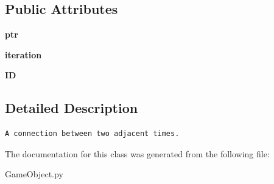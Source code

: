 \subsection*{Public Attributes}
\begin{CompactItemize}
\item 
\hypertarget{classGameObject_1_1Portal_b8d30df65bff59aa2336d8a1f8a266d7}{
\textbf{ptr}}
\label{classGameObject_1_1Portal_b8d30df65bff59aa2336d8a1f8a266d7}

\item 
\hypertarget{classGameObject_1_1Portal_f5373bbc57189b566748d050c4eafad5}{
\textbf{iteration}}
\label{classGameObject_1_1Portal_f5373bbc57189b566748d050c4eafad5}

\item 
\hypertarget{classGameObject_1_1Portal_b3b6e17b22187150345d32dc1cde60ed}{
\textbf{ID}}
\label{classGameObject_1_1Portal_b3b6e17b22187150345d32dc1cde60ed}

\end{CompactItemize}


\subsection{Detailed Description}


\footnotesize\begin{verbatim}A connection between two adjacent times.
\end{verbatim}
\normalsize
 

The documentation for this class was generated from the following file:\begin{CompactItemize}
\item 
GameObject.py\end{CompactItemize}
